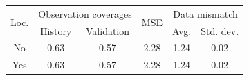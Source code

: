 \begin{tabular}{cccccc}
\toprule
\multirow{2}{*}{Loc.} 
& 
\multicolumn{2}{c}{Observation coverages} & 
\multirow{2}{*}{%
    MSE
} & 
\multicolumn{2}{c}{Data mismatch} 
\\
& History & Validation & & Avg. & Std. dev.
\\
\midrule
No & 0.63 & 0.57 & 2.28 & 1.24 & 0.02 \\
Yes & 0.63 & 0.57 & 2.28 & 1.24 & 0.02 \\
\bottomrule
\end{tabular}
